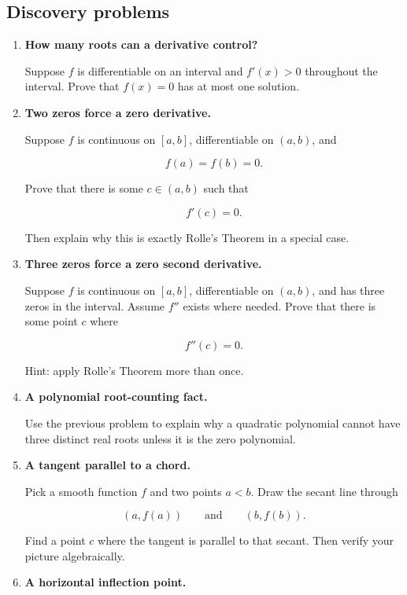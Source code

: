 \subsection{Discovery problems}
\label{subsec:chapter-6-discovery-problems}

\begin{enumerate}
\item \textbf{How many roots can a derivative control?}

Suppose \(f\) is differentiable on an interval and \(f'(x)>0\) throughout the interval.
Prove that \(f(x)=0\) has at most one solution.

\item \textbf{Two zeros force a zero derivative.}

Suppose \(f\) is continuous on \([a,b]\), differentiable on \((a,b)\), and

\[
f(a)=f(b)=0.
\]

Prove that there is some \(c\in(a,b)\) such that

\[
f'(c)=0.
\]

Then explain why this is exactly Rolle's Theorem in a special case.

\item \textbf{Three zeros force a zero second derivative.}

Suppose \(f\) is continuous on \([a,b]\), differentiable on \((a,b)\), and has three
zeros in the interval.  Assume \(f''\) exists where needed.  Prove that there is some
point \(c\) where

\[
f''(c)=0.
\]

Hint: apply Rolle's Theorem more than once.

\item \textbf{A polynomial root-counting fact.}

Use the previous problem to explain why a quadratic polynomial cannot have three
distinct real roots unless it is the zero polynomial.

\item \textbf{A tangent parallel to a chord.}

Pick a smooth function \(f\) and two points \(a<b\).  Draw the secant line through

\[
(a,f(a))
\qquad\text{and}\qquad
(b,f(b)).
\]

Find a point \(c\) where the tangent is parallel to that secant.  Then verify your
picture algebraically.

\item \textbf{A horizontal inflection point.}


\end{enumerate}
